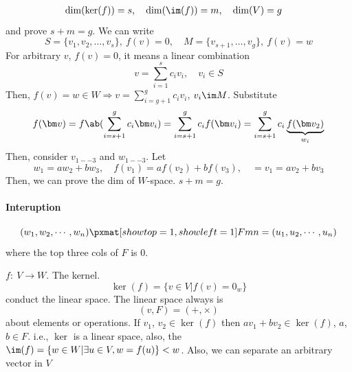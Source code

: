 \begin{solution}[By TA]
\begin{enumext}
\begin{align*}
      \dim(\ker(f)) & = s, \quad \dim(\im(f)) = m, \quad \dim(V) = g
    \end{align*}
    and prove $s + m = g$.
    We can write
    \[
      S = \{v_1, v_2, \ldots, v_s\}, ~ f(v) = 0, \quad
      M = \{v_{s+1}, \ldots, v_g\},  ~ f(v) = w
    \]
    For arbitrary $v$, $f(v) = 0$, it means a linear combination
    \[
      v = \sum_{i=1}^s c_iv_i, \quad v_i \in S
    \]
    Then, $f(v) = w \in W \Rightarrow v = \sum_{i=g+1}^g c_iv_i$, $v_i \im M$.
    Substitute
    \[
      f(\bm v) = f\ab(\sum_{i=s+1}^g c_i \bm v_i)
    = \sum_{i=s+1}^g c_i f(\bm v_i)
    = \sum_{i=s+1}^g c_i \underbrace{f(\bm v_2)}_{w_i}
    \]
    Then, consider $v_{1 -- 3}$ and $w_{1 -- 3}$. Let
    \[
      w_1 = aw_2 + bw_3, \quad
      f(v_1) = af(v_2) + bf(v_3), \quad = v_1 = av_2 + bv_3
    \]
    Then, we can prove the dim of $W$-space. $s + m = g$.
    \paragraph{Interuption}
    \[
      (w_1, w_2, \cdots, w_n)
      \pxmat[showtop = 1, showleft = 1]Fmn =
      (u_1, u_2, \cdots, u_n)
    \]
    where the top three cols of $F$ is $0$.
  \end{enumext}
  \begin{remark}
    $f:\ V\to W$. The kernel.
    \[
      \ker(f) = \{v\in V|f(v) = 0_w\}
    \]
    conduct the linear space.
    The linear space always is
    \[
      (v, F) = (+, \times)
    \]
    about elements or operations.
    If $v_1$, $v_2 \in \ker(f)$ then $av_1 + bv_2 \in \ker(f)$, $a$, $b \in F$.
    i.e., $\ker$ is a linear space, also,
    the $\im(f) = \{w\in W|\exists u\in V, w = f(u)\} < w$.
    Also, we can separate an arbitrary vector in $V$
    \begin{center}
    \end{center}
  \end{remark}
\end{solution}
\begin{problem}
\end{problem}
